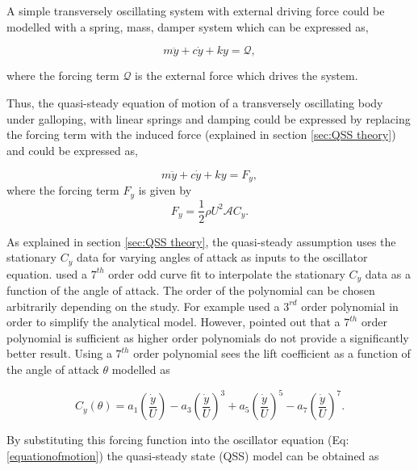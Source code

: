 A simple transversely oscillating system with external driving force could be modelled with a spring, mass, damper system which can be expressed as,   

\begin{equation}
\label{equationofmotion_1}
m\ddot{y}+c\dot{y}+ky=\mathcal{Q},
\end{equation}

where the forcing term $\mathcal{Q}$ is the external force which drives the system.

Thus, the quasi-steady equation of motion of a transversely oscillating body under galloping, with linear springs and damping could be expressed by replacing the forcing term with the induced force (explained in section \ref{sec:QSS theory}) and could be expressed as,  

\begin{equation}
\label{equationofmotion}
m\ddot{y}+c\dot{y}+ky=F_y,
\end{equation}
where the forcing term $F_y$ is given by
\begin{equation}
\label{lift equation}
F_y=\frac{1}{2}\rho U^2\mathcal{A}C_y.
\end{equation}

As explained in section \ref{sec:QSS theory}, the quasi-steady assumption uses the stationary $C_y$ data for varying angles of attack as inputs to the oscillator equation. \citet{Parkinson1964} used a $7^{th}$ order odd curve fit to interpolate the stationary $C_y$ data as a function of the angle of attack. The order of the polynomial can be chosen arbitrarily depending on the study. For example \citet{Barrero-Gil2009,Barrero-Gil2010a} used a $3^{rd}$ order polynomial in order to simplify the analytical model. However, \citet{Ng2005} pointed out that a $7^{th}$ order polynomial is sufficient as higher order polynomials do not provide a significantly better result. Using a $7^{th}$ order polynomial sees the lift coefficient as a function of the angle of attack $\theta$ modelled as

\begin{equation}
\label{cy ploynomial}
C_y(\theta)=a_1\left(\frac{\dot{y}}{U}\right)-a_3\left(\frac{\dot{y}}{U}\right)^3+a_5\left(\frac{\dot{y}}{U}\right)^5-a_7\left(\frac{\dot{y}}{U}\right)^7.
\end{equation}

By substituting this forcing function into the oscillator equation (Eq:\ref{equationofmotion}) the quasi-steady state (QSS) model can be obtained as

